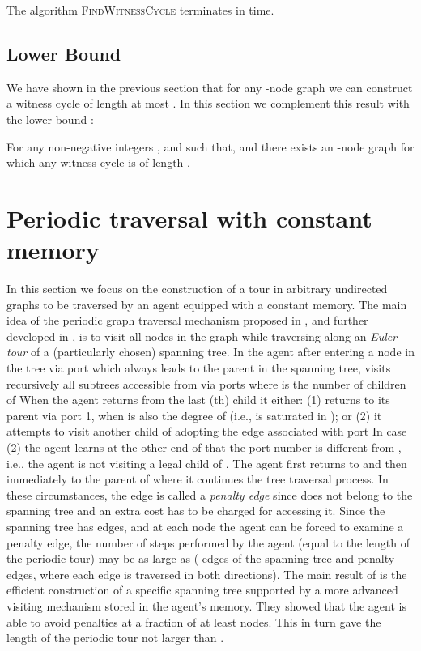 \documentclass[11pt,envcountsame,oribibl]{llncs}
\begin{document}
\begin{theorem} \label{th:complexity}
The algorithm \textsc{FindWitnessCycle} terminates in  time.
\end{theorem}

\subsection{Lower Bound}
We have shown in the previous section that for any -node graph we can construct
a witness cycle of length at most .
In this section we complement this result with the lower bound :

\begin{theorem} \label{th:lb}
For any non-negative integers ,  and  such that,  and 
there exists an -node graph for which any witness cycle
is of length .
\end{theorem}




\section{Periodic traversal with constant memory}

In this section we focus on the construction of a tour in arbitrary
undirected graphs to be traversed by an agent equipped with
a constant memory.
The main idea of the periodic graph traversal mechanism
proposed in \cite{Ilc06}, and further developed in \cite{GKMNZ08},
is to visit all nodes in the graph while traversing along an
{\sl Euler tour} of a (particularly chosen) spanning tree.
In \cite{Ilc06} the agent after entering a node  in the tree via port 
which always leads to the parent in the spanning tree,
visits recursively all subtrees accessible from  via ports
 where  is the number of children of 
When the agent returns from the last (th) child it either:
(1) returns to its parent via port 1, when  is also the degree of
 (i.e.,  is saturated in ); or
(2) it attempts to visit another child of  adopting the edge 
associated with port 
In case (2) the agent learns at the other end of  that the port number is
different from , i.e.,
the agent is not visiting a legal child of .
The agent first returns to  and
then immediately to
the parent of  where it continues the tree traversal process.
In these circumstances, the edge  is called a {\sl penalty edge}
since  does not belong to the spanning
tree and an extra cost has to be charged for accessing it.
Since the spanning tree
has  edges, and at each node the agent can be forced to examine a
penalty
edge, the number of steps
performed by the agent (equal to the length of the periodic tour)
may be as large as  ( edges of the spanning tree and 
penalty edges, where each edge is traversed in both directions).
The main result of \cite{GKMNZ08} is the efficient construction of a specific
spanning tree
supported by a more advanced visiting mechanism stored in the agent's memory.
They showed that the agent is able to avoid penalties
at a fraction of at least  nodes. This in turn gave the
length of
the periodic tour not larger than .
\end{document}
